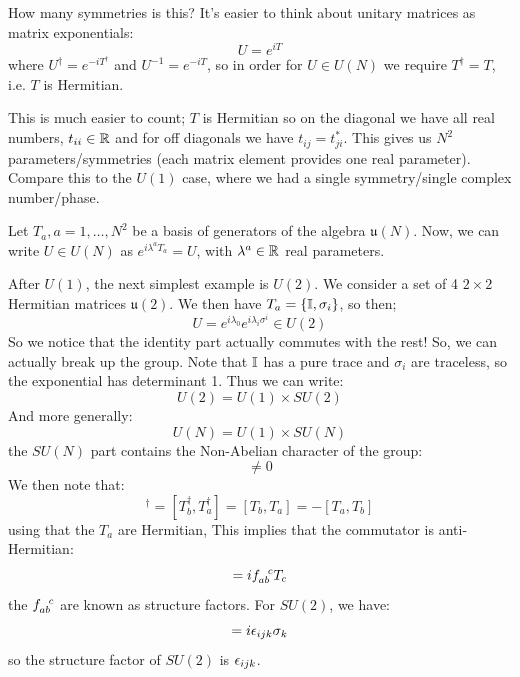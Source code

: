How many symmetries is this? It's easier to think about unitary matrices as matrix exponentials:
\begin{equation}
    U = e^{iT}
\end{equation}
where $U^\dag = e^{-iT^\dag}$ and $U^{-1} = e^{-iT}$, so in order for $U \in U(N)$ we require $T^\dag = T$, i.e. $T$ is Hermitian.

This is much easier to count; $T$ is Hermitian so on the diagonal we have all real numbers, $t_{ii} \in \mathbb{R}$ and for off diagonals we have $t_{ij} = t_{ji}^*$. This gives us $N^2$ parameters/symmetries (each matrix element provides one real parameter). Compare this to the $U(1)$ case, where we had a single symmetry/single complex number/phase.

Let $T_a, a = 1, \ldots, N^2$ be a basis of generators of the algebra $\mathfrak{u}(N)$. Now, we can write $U \in U(N)$ as $e^{i\lambda^a T_a} = U$, with $\lambda^a \in \mathbb{R}$ real parameters.

After $U(1)$, the next simplest example is $U(2)$. We consider a set of 4 $2\times 2$ Hermitian matrices $\mathfrak{u}(2)$. We then have $T_a = \set{\mathbb{I}, \sigma_i}$, so then;
\begin{equation}
    U = e^{i\lambda_0}e^{i\lambda_i\sigma^i} \in U(2)
\end{equation}
So we notice that the identity part actually commutes with the rest! So, we can actually break up the group. Note that $\mathbb{I}$ has a pure trace and $\sigma_i$ are traceless, so the exponential has determinant 1. Thus we can write:
\begin{equation}
    U(2) = U(1) \times SU(2)
\end{equation}
And more generally:
\begin{equation}
    U(N) = U(1) \times SU(N)
\end{equation}
the $SU(N)$ part contains the Non-Abelian character of the group:
\begin{equation}
    [T_a, T_b] \neq 0
\end{equation}
We then note that:
\begin{equation}
    [T_a, T_b]^\dag = [T_b^\dag, T_a^\dag] = [T_b, T_a] = -[T_a, T_b]
\end{equation}
using that the $T_a$ are Hermitian, This implies that the commutator is anti-Hermitian:
\begin{equation}
    [T_a, T_b] = if_{ab}^{\sp \sp c}T_c
\end{equation}
the $f_{ab}^{\sp \sp c}$ are known as structure factors. For $SU(2)$, we have:
\begin{equation}
    [\sigma_i, \sigma_j] = i\e_{ijk}\sigma_k
\end{equation}
so the structure factor of $SU(2)$ is $\epsilon_{ijk}$.

